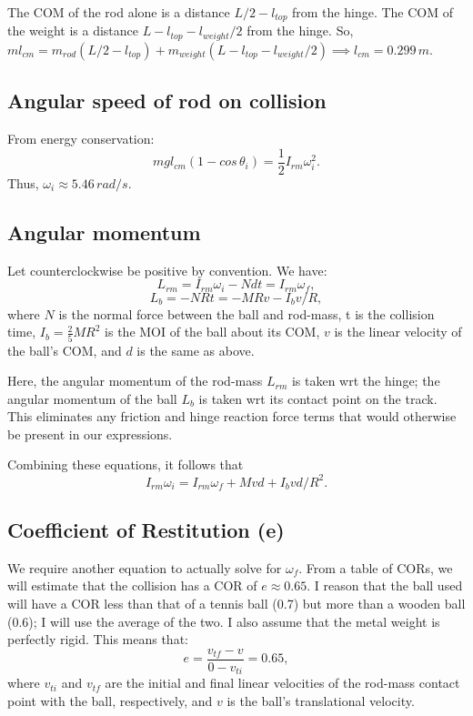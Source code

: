 \documentclass[12pt]{article} %
\begin{document}
The COM of the rod alone is a distance $L/2 - l_{top}$ from the hinge. The COM of the weight is a distance $L - l_{top} - l_{weight}/2$ from the hinge.
So, $ml_{cm} = m_{rod} (L/2 - l_{top}) + m_{weight} (L - l_{top} - l_{weight}/2) \implies l_{cm} = 0.299\,m$.

\subsection{Angular speed of rod on collision}

From energy conservation:
$$mgl_{cm}(1-cos\,\theta_i) = \frac{1}{2}I_{rm}\omega_i^2.$$
Thus, $\omega_i \approx 5.46\, rad/s$.

\subsection{Angular momentum}

Let counterclockwise be positive by convention. We have:
$$L_{rm} = I_{rm}\omega_i - Ndt = I_{rm}\omega_f,$$
$$L_b = -NRt = -MRv - I_b v/R,$$
where $N$ is the normal force between the ball and rod-mass, t is the collision time, $I_b = \frac{2}{5}MR^2$ is the MOI of the ball about its COM, $v$ is the linear velocity of the ball's COM, and $d$ is the same as above.

Here, the angular momentum of the rod-mass $L_{rm}$ is taken wrt the hinge; the angular momentum of the ball $L_b$ is taken wrt its contact point on the track. This eliminates any friction and hinge reaction force terms that would otherwise be present in our expressions.

Combining these equations, it follows that
$$I_{rm} \omega_i = I_{rm} \omega_f + Mvd + I_b vd/R^2.$$

\subsection{Coefficient of Restitution (e)}

We require another equation to actually solve for $\omega_f$. From a table of CORs, we will estimate that the collision has a COR of $e \approx 0.65$. I reason that the ball used will have a COR less than that of a tennis ball (0.7) but more than a wooden ball (0.6); I will use the average of the two. I also assume that the metal weight is perfectly rigid.
This means that: $$e = \frac{v_{tf} - v}{0-v_{ti}} = 0.65,$$
where $v_{ti}$ and $v_{tf}$ are the initial and final linear velocities of the rod-mass contact point with the ball, respectively, and $v$ is the ball's translational velocity.
\end{document}
